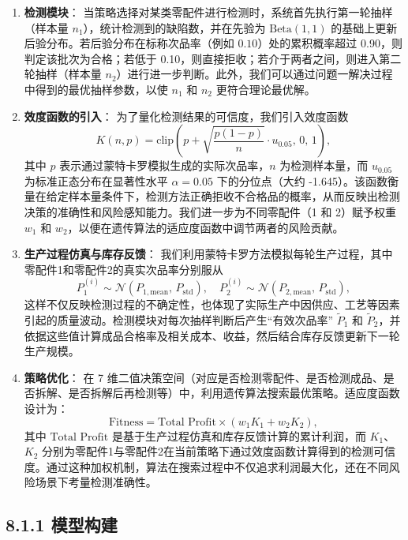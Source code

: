\documentclass{article}
\begin{document}
	\begin{enumerate}
		\item \textbf{检测模块}：  
		当策略选择对某类零配件进行检测时，系统首先执行第一轮抽样（样本量 $n_1$），统计检测到的缺陷数，并在先验为 $\text{Beta}(1,1)$ 的基础上更新后验分布。若后验分布在标称次品率（例如 $0.10$）处的累积概率超过 0.90，则判定该批次为合格；若低于 0.10，则直接拒收；若介于两者之间，则进入第二轮抽样（样本量 $n_2$）进行进一步判断。此外，我们可以通过问题一解决过程中得到的最优抽样参数，以使 $n_1$ 和 $n_2$ 更符合理论最优解。
		
		\item \textbf{效度函数的引入}：  
		为了量化检测结果的可信度，我们引入效度函数
		\[
		K(n, p) = \text{clip}\left( p + \sqrt{\frac{p(1-p)}{n}} \cdot u_{0.05}, \, 0, \, 1 \right),
		\]
		其中 $p$ 表示通过蒙特卡罗模拟生成的实际次品率，$n$ 为检测样本量，而 $u_{0.05}$ 为标准正态分布在显著性水平 $\alpha=0.05$ 下的分位点（大约 -1.645）。该函数衡量在给定样本量条件下，检测方法正确拒收不合格品的概率，从而反映出检测决策的准确性和风险感知能力。我们进一步为不同零配件（1 和 2）赋予权重 $w_1$ 和 $w_2$，以便在遗传算法的适应度函数中调节两者的风险贡献。
		
		\item \textbf{生产过程仿真与库存反馈}：  
		我们利用蒙特卡罗方法模拟每轮生产过程，其中零配件1和零配件2的真实次品率分别服从
		\[
		P_1^{(i)} \sim \mathcal{N}(P_{1,\text{mean}},\,P_{\text{std}}),\quad
		P_2^{(i)} \sim \mathcal{N}(P_{2,\text{mean}},\,P_{\text{std}}),
		\]
		这样不仅反映检测过程的不确定性，也体现了实际生产中因供应、工艺等因素引起的质量波动。检测模块对每次抽样判断后产生“有效次品率” $\tilde{P}_1$ 和 $\tilde{P}_2$，并依据这些值计算成品合格率及相关成本、收益，然后结合库存反馈更新下一轮生产规模。
		
		\item \textbf{策略优化}：  
		在 7 维二值决策空间（对应是否检测零配件、是否检测成品、是否拆解、是否拆解后再检测等）中，利用遗传算法搜索最优策略。适应度函数设计为：
		\[
		\text{Fitness} = \text{Total Profit} \times \left( w_1 K_1 + w_2 K_2 \right),
		\]
		其中 $\text{Total Profit}$ 是基于生产过程仿真和库存反馈计算的累计利润，而 $K_1$、$K_2$ 分别为零配件1与零配件2在当前策略下通过效度函数计算得到的检测可信度。通过这种加权机制，算法在搜索过程中不仅追求利润最大化，还在不同风险场景下考量检测准确性。
	\end{enumerate}
	
	\subsection*{8.1.1 模型构建}
	
\end{document}
